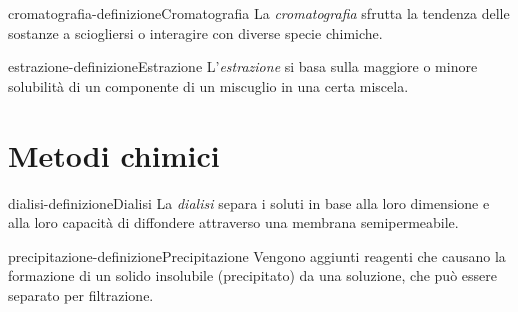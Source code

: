 \documentclass[preview]{standalone}
\begin{document}
\begin{snippetdefinition}{cromatografia-definizione}{Cromatografia}
    La \textit{cromatografia} sfrutta la tendenza delle sostanze a sciogliersi o interagire
    con diverse specie chimiche.
\end{snippetdefinition}

\begin{snippetdefinition}{estrazione-definizione}{Estrazione}
    L'\textit{estrazione} si basa sulla maggiore o minore solubilità di un componente di un miscuglio in una certa miscela.
\end{snippetdefinition}

\section{Metodi chimici}


\begin{snippetdefinition}{dialisi-definizione}{Dialisi}
    La \textit{dialisi} separa i soluti in base alla loro dimensione e alla loro capacità di diffondere attraverso una
    membrana semipermeabile.
\end{snippetdefinition}

\begin{snippetdefinition}{precipitazione-definizione}{Precipitazione}
    Vengono aggiunti reagenti che causano la formazione di un solido insolubile (precipitato)
    da una soluzione, che può essere separato per filtrazione.
\end{snippetdefinition}
\end{document}
